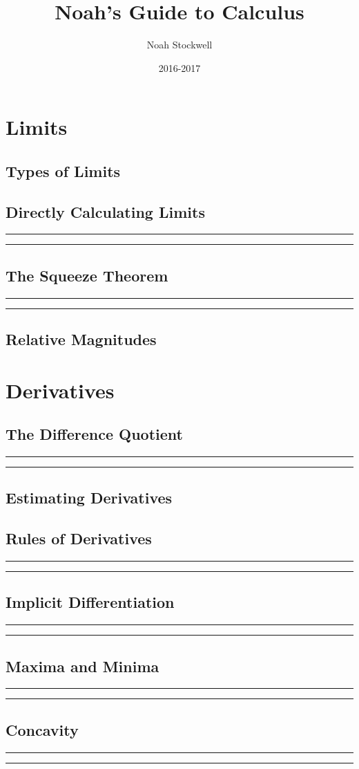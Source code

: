 \documentclass{article}
\title{Noah's Guide to Calculus}
\author{Noah Stockwell}
\date{2016-2017}
\newcommand{\newMidline}
{
	\noindent
	\rule{\textwidth}{.5pt}
}
\newcommand{\newchapter}[2]
{
	\subsection{#1}\vspace{.25in}\newMidline\newMidline\vspace{.125in}
}
\begin{document}
\maketitle
\vspace{2in}
\begin{center}\end{center}
\newpage

\newpage

\newpage
\tableofcontents
{}
\newpage
\section{Limits} 
\subsection{Types of Limits}  
\newpage\newchapter{Directly Calculating Limits}{DirectlyCalculatingLimits}
\newpage\subsection{The Squeeze Theorem}\newMidline\newMidline\vspace{.125in}
\subsection{Relative Magnitudes} \newpage
\newpage
{}
\newpage\section{Derivatives} 
\newchapter{The Difference Quotient}{DifferenceQuotient}
\subsection{Estimating Derivatives}
\newchapter{Rules of Derivatives}{DerivativeRules}
\newchapter{Implicit Differentiation}{ImplicitDifferentiation}
\newchapter{Maxima and Minima}{MaxAndMin}
\newchapter{Concavity}{Concavity}
\end{document}
